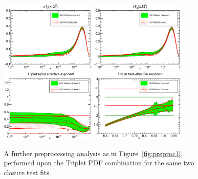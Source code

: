 \clearpage
\begin{figure}[!]
\centering
\includegraphics[width=0.42\textwidth]{7-PostLHC/figs/Preproc1/pdf_xT3_log_others.eps}
\includegraphics[width=0.42\textwidth]{7-PostLHC/figs/Preproc2/pdf_xT3_log_others.eps}
\includegraphics[width=0.42\textwidth]{7-PostLHC/figs/Preproc2/alphapreproc_3.eps}
\includegraphics[width=0.42\textwidth]{7-PostLHC/figs/Preproc2/betapreproc_3.eps}
\caption[Demonstration of the impact made by changes in preprocessing to the triplet PDF in a closure test fit]{A further preprocessing analysis as in Figure~\ref{fig:preproc1}, performed upon the Triplet PDF combination for the same two closure test fits.}
\label{fig:preproc2}
\end{figure}

